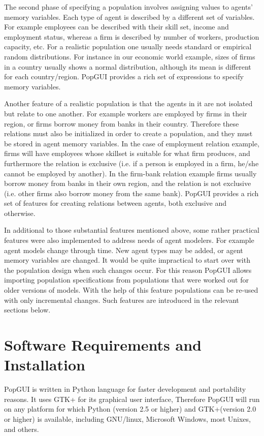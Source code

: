 \documentclass{article}
\begin{document}
The second phase of specifying a population involves assigning values to agents' memory variables. Each type of agent is described by a different set of variables. For example employees can be described with their skill set, income and employment status, whereas a firm is described by number of workers, production capacity, etc. For a realistic population one usually needs standard or empirical random  distributions. For instance in our economic world example, sizes of firms in a country usually shows a normal distribution, although its mean is different for each country/region. PopGUI provides a rich set of expressions to specify memory variables.

Another feature of a realistic population is that the agents in it are not isolated but relate to one another. For example workers are employed by firms in their region, or firms borrow money from banks in their country. Therefore these relations must also be initialized in order to create a population, and they must be stored in agent memory variables. In the case of employment relation example, firms will have employees whose skillset is suitable for what firm produces, and furthermore the relation is exclusive (i.e. if a person is employed in a firm, he/she cannot be employed by another). In the firm-bank relation example firms usually borrow money from banks in their own region, and the relation is not exclusive (i.e. other firms also borrow money from the same bank). PopGUI provides a rich set of features for creating relations between agents, both exclusive and otherwise. 

In additional to those substantial features mentioned above, some rather practical features were also implemented to address needs of agent modelers. For example agent models change through time. New agent types may be added, or agent memory variables are changed. It would be quite impractical to start over with the population design when such changes occur. For this reason PopGUI allows importing population specifications from populations that were worked out for older versions of models. With the help of this feature populations can be re-used with only incremental changes. Such features are introduced in the relevant sections below.

\section{Software Requirements and Installation}
PopGUI is written in Python language for faster development and portability reasons. It uses GTK+ for its graphical user interface, Therefore PopGUI will run on any platform for which Python (version 2.5 or higher) and GTK+(version 2.0 or higher) is available, including GNU/linux, Microsoft Windows, most Unixes, and others.
\end{document}
